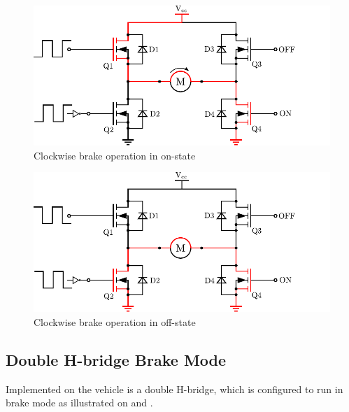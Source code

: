   \begin{minipage}{\linewidth}
  	\centering
  	\begin{minipage}{0.45\linewidth}
  		\begin{figure}[H]
  			\centering
  			\includegraphics[scale=.6]{figures/HbridgeClockwiseBrakeON.pdf}
  			\caption{Clockwise brake operation in on-state}
  			\label{HbridgeClockwiseBrakeON}
  		\end{figure}
  	\end{minipage}
  	\hspace{0.03\linewidth}
  	\begin{minipage}{0.45\linewidth}
  		\begin{figure}[H]
  			\centering
  			\includegraphics[scale=.6]{figures/HbridgeClockwiseBrakeOFF.pdf}
  			\caption{Clockwise brake operation in off-state}
  			\label{HbridgeClockwiseBrakeOFF}
  		\end{figure}
  	\end{minipage}
  \end{minipage}

\subsection{Double H-bridge Brake Mode}
Implemented on the vehicle is a double H-bridge, which is configured to run in brake mode as illustrated on  and . 

